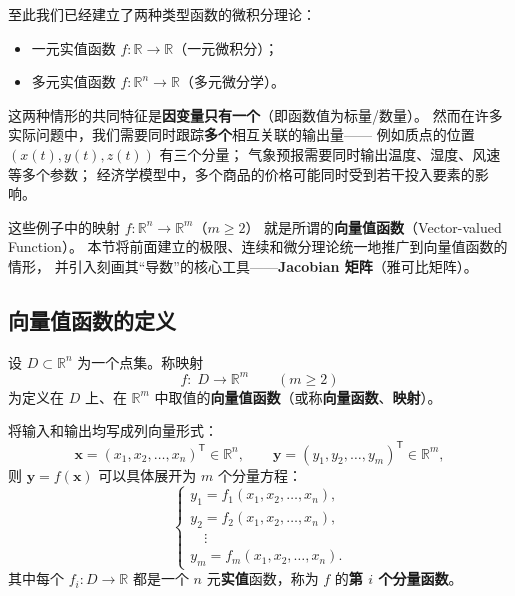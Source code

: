 \documentclass[lang=cn,11pt]{elegantbook}
\begin{document}
至此我们已经建立了两种类型函数的微积分理论：
\begin{itemize}
  \item 一元实值函数 $f:\mathbb R\to\mathbb R$（一元微积分）；
  \item 多元实值函数 $f:\mathbb R^n\to\mathbb R$（多元微分学）。
\end{itemize}

这两种情形的共同特征是\textbf{因变量只有一个}（即函数值为标量/数量）。
然而在许多实际问题中，我们需要同时跟踪\textbf{多个}相互关联的输出量——
例如质点的位置 $(x(t),y(t),z(t))$ 有三个分量；
气象预报需要同时输出温度、湿度、风速等多个参数；
经济学模型中，多个商品的价格可能同时受到若干投入要素的影响。

这些例子中的映射 $f:\mathbb R^n\to\mathbb R^m$（$m\geq 2$）
就是所谓的\textbf{向量值函数}（Vector-valued Function）。
本节将前面建立的极限、连续和微分理论统一地推广到向量值函数的情形，
并引入刻画其“导数”的核心工具——\textbf{Jacobian 矩阵}（雅可比矩阵）。


\subsection{向量值函数的定义}

\begin{definition} \label{def:vec-func}
设 $D\subset\mathbb R^n$ 为一个点集。称映射
\[
f:\;D\longrightarrow\mathbb R^m\qquad(m\geq 2)
\]
为定义在 $D$ 上、在 $\mathbb R^m$ 中取值的\textbf{向量值函数}（或称\textbf{向量函数}、\textbf{映射}）。

将输入和输出均写成列向量形式：
\[
\boldsymbol x=(x_1,x_2,\dots,x_n)^{\mathsf T}\in\mathbb R^n,\qquad
\boldsymbol y=(y_1,y_2,\dots,y_m)^{\mathsf T}\in\mathbb R^m,
\]
则 $\boldsymbol y=f(\boldsymbol x)$ 可以具体展开为 $m$ 个分量方程：
\[
\begin{cases}
y_1=f_1(x_1,x_2,\dots,x_n),\\
y_2=f_2(x_1,x_2,\dots,x_n),\\
\quad\vdots\\
y_m=f_m(x_1,x_2,\dots,x_n).
\end{cases}
\tag{$\star$}
\]
其中每个 $f_i:D\to\mathbb R$ 都是一个 $n$ 元\textbf{实值}函数，称为 $f$ 的\textbf{第 $i$ 个分量函数}。
\end{definition}
\end{document}
